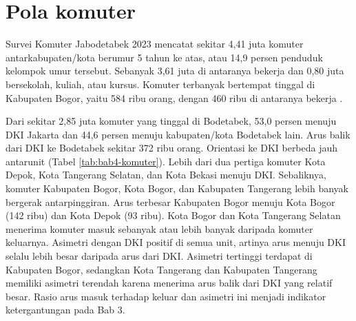 \documentclass[12pt,a4paper,oneside,openany,indonesian]{report}
\begin{document}
\section{Pola komuter}

Survei Komuter Jabodetabek 2023 mencatat sekitar 4,41 juta komuter antarkabupaten/kota berumur 5 tahun ke atas, atau 14,9 persen penduduk kelompok umur tersebut. Sebanyak 3,61 juta di antaranya bekerja dan 0,80 juta bersekolah, kuliah, atau kursus. Komuter terbanyak bertempat tinggal di Kabupaten Bogor, yaitu 584 ribu orang, dengan 460 ribu di antaranya bekerja \parencite[Tabel 1 dan 4]{bpskomuter2023}.

Dari sekitar 2,85 juta komuter yang tinggal di Bodetabek, 53,0 persen menuju DKI Jakarta dan 44,6 persen menuju kabupaten/kota Bodetabek lain. Arus balik dari DKI ke Bodetabek sekitar 372 ribu orang. Orientasi ke DKI berbeda jauh antarunit (Tabel \ref{tab:bab4-komuter}). Lebih dari dua pertiga komuter Kota Depok, Kota Tangerang Selatan, dan Kota Bekasi menuju DKI. Sebaliknya, komuter Kabupaten Bogor, Kota Bogor, dan Kabupaten Tangerang lebih banyak bergerak antarpinggiran. Arus terbesar Kabupaten Bogor menuju Kota Bogor (142 ribu) dan Kota Depok (93 ribu). Kota Bogor dan Kota Tangerang Selatan menerima komuter masuk sebanyak atau lebih banyak daripada komuter keluarnya. Asimetri dengan DKI positif di semua unit, artinya arus menuju DKI selalu lebih besar daripada arus dari DKI. Asimetri tertinggi terdapat di Kabupaten Bogor, sedangkan Kota Tangerang dan Kabupaten Tangerang memiliki asimetri terendah karena menerima arus balik dari DKI yang relatif besar. Rasio arus masuk terhadap keluar dan asimetri ini menjadi indikator ketergantungan pada Bab 3.
\end{document}
